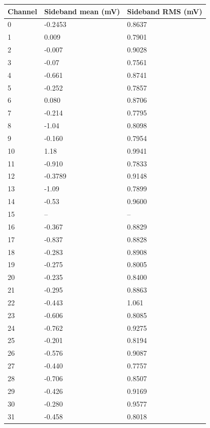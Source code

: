 \documentclass[12pt]{article}
\begin{document}
\begin{table}[ht!]
    \scriptsize
    \centering
    \begin{tabular}{lll}
	Channel & Sideband mean (mV)& Sideband RMS (mV)\\
	\hline
	    0 & -0.2453  & 0.8637    \\      
	    1 &  0.009&     0.7901   \\
	    2 &  -0.007  &  0.9028   \\ 
	    3 &  -0.07&     0.7561   \\
	    4 &  -0.661&    0.8741   \\
	    5 &  -0.252&    0.7857   \\
	    6 &  0.080&     0.8706   \\
	    7 &  -0.214&    0.7795   \\
	    8 &  -1.04&     0.8098   \\
	    9 &  -0.160&    0.7954   \\
	    10 & 1.18&      0.9941   \\
	    11 & -0.910&    0.7833   \\
	    12 & -0.3789 &  0.9148   \\  
	    13 & -1.09&     0.7899   \\
	    14 & -0.53&     0.9600   \\
	    15 & --&        --       \\
	    16 & -0.367&    0.8829   \\
	    17 & -0.837&    0.8828   \\
	    18 & -0.283&    0.8908   \\
	    19 & -0.275&    0.8005   \\
	    20 & -0.235&    0.8400   \\
	    21 & -0.295&    0.8863   \\
	    22 & -0.443&    1.061    \\
	    23 & -0.606&    0.8085   \\
	    24 & -0.762&    0.9275   \\
	    25 & -0.201&    0.8194   \\
	    26 & -0.576&    0.9087   \\
	    27 & -0.440&    0.7757   \\
	    28 & -0.706&    0.8507   \\
	    29 & -0.426&    0.9169   \\
	    30 & -0.280&    0.9577   \\
	    31 & -0.458  &  0.8018   \\ 
    \end{tabular}
\end{table}
\end{document}
